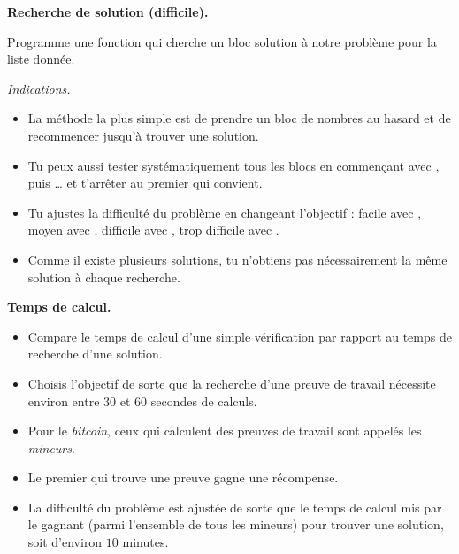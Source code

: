 \documentclass[12pt,class=report,crop=false]{standalone}
\begin{document}
  \bigskip
  
\textbf{Recherche de solution (difficile).}
  
  Programme une fonction  qui cherche un bloc  solution à notre problème pour la liste donnée. 
  
  \bigskip
  
  \emph{Indications.}
  
  \begin{itemize}
    \item La méthode la plus simple est de prendre un bloc  de nombres au hasard et de recommencer jusqu'à trouver une solution.
    
    \item Tu peux aussi tester systématiquement tous les blocs en commençant avec \ci{[0,0,0,0,0,0]}, puis \ci{[0,0,0,0,0,1]}\ldots{} et t'arrêter au premier qui convient.
    
    \item Tu ajustes la difficulté du problème en changeant l'objectif : facile avec , moyen avec , difficile avec , trop difficile avec .
    
    \item Comme il existe plusieurs solutions, tu n'obtiens pas nécessairement la même solution à chaque recherche. 
    
   \end{itemize}
   
\newpage   

 \textbf{Temps de calcul.}
   
   \begin{itemize}
   \item  Compare le temps de calcul d'une simple vérification par rapport au temps de recherche d'une solution. 
   
   \item Choisis l'objectif  de sorte que la recherche d'une preuve de travail nécessite environ entre 30 et 60 secondes de calculs.
  
  \item Pour le \emph{bitcoin}, ceux qui calculent des preuves de travail sont appelés les \emph{mineurs}. 
  
  \item Le premier qui trouve une preuve gagne une récompense. 
  
  \item La difficulté du problème est ajustée de sorte 
que le temps de calcul mis par le gagnant (parmi l'ensemble de tous les mineurs) pour trouver une solution, soit d'environ $10$ minutes.

  \end{itemize}
\end{document}
